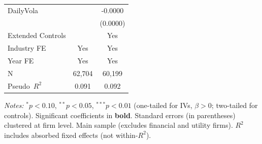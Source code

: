 \documentclass[11pt,a4paper]{article}
\begin{document}
\begin{table}[htbp]
\begin{tabular}{lcc}
DailyVola &  & -0.0000 \\
 &  & (0.0000) \\
\midrule
Extended Controls &  & Yes \\
Industry FE & Yes & Yes \\
Year FE & Yes & Yes \\
\midrule
N & 62,704 & 60,199 \\
Pseudo~$R^2$ & 0.091 & 0.092 \\
\bottomrule
\end{tabular}
\begin{minipage}{\linewidth}
\vspace{2pt}\scriptsize
\textit{Notes:} $^{*}p<0.10$, $^{**}p<0.05$, $^{***}p<0.01$ (one-tailed for IVs, $\beta > 0$; two-tailed for controls).
 Significant coefficients in \textbf{bold}.
 Standard errors (in parentheses) clustered at firm level.
 Main sample (excludes financial and utility firms).
 $R^2$ includes absorbed fixed effects (not within-$R^2$).
\end{minipage}
\end{table}
\clearpage
\end{document}
